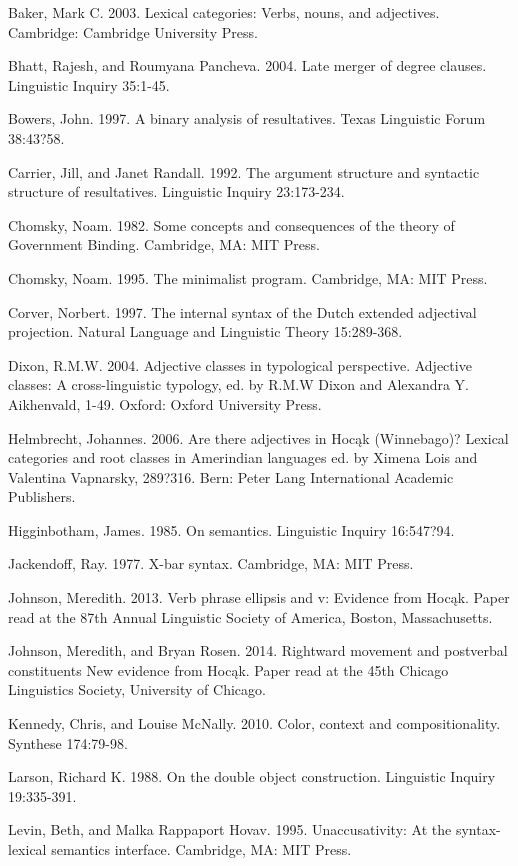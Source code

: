\documentclass[output=paper]{LSP/langsci}
\begin{document}
\begin{reflist}

Baker, Mark C. 2003. Lexical categories: Verbs, nouns, and adjectives. Cambridge: Cambridge
University Press.

Bhatt, Rajesh, and Roumyana Pancheva. 2004. Late merger of degree clauses. Linguistic Inquiry 35:1-45.

Bowers, John. 1997. A binary analysis of resultatives. Texas Linguistic Forum 38:43?58.

Carrier, Jill, and Janet Randall. 1992. The argument structure and syntactic structure of resultatives. Linguistic Inquiry 23:173-234.

Chomsky, Noam. 1982. Some concepts and consequences of the theory of Government Binding. Cambridge, MA: MIT Press.

Chomsky, Noam. 1995. The minimalist program. Cambridge, MA: MIT Press.

Corver, Norbert. 1997. The internal syntax of the Dutch extended adjectival projection. Natural Language and Linguistic Theory 15:289-368.

Dixon, R.M.W. 2004. Adjective classes in typological perspective. Adjective classes: A cross-linguistic typology, ed. by R.M.W Dixon and Alexandra Y. Aikhenvald, 1-49. Oxford: Oxford University Press.

Helmbrecht, Johannes. 2006. Are there adjectives in Hocąk (Winnebago)? Lexical categories and root classes in Amerindian languages ed. by Ximena Lois and Valentina Vapnarsky, 289?316. Bern: Peter Lang International Academic Publishers.

Higginbotham, James. 1985. On semantics. Linguistic Inquiry 16:547?94.

Jackendoff, Ray. 1977. X-bar syntax. Cambridge, MA: MIT Press.

Johnson, Meredith. 2013. Verb phrase ellipsis and v: Evidence from Hocąk. Paper read at the 87th Annual Linguistic Society of America, Boston, Massachusetts.

Johnson, Meredith, and Bryan Rosen. 2014. Rightward movement and postverbal constituents New evidence from Hocąk. Paper read at the 45th Chicago Linguistics Society, University of Chicago.

Kennedy, Chris, and Louise McNally. 2010. Color, context and compositionality. Synthese 174:79-98.

Larson, Richard K. 1988. On the double object construction. Linguistic Inquiry 19:335-391.

Levin, Beth, and Malka Rappaport Hovav. 1995. Unaccusativity: At the syntax-lexical semantics interface. Cambridge, MA: MIT Press.


\end{reflist}
\end{document}
